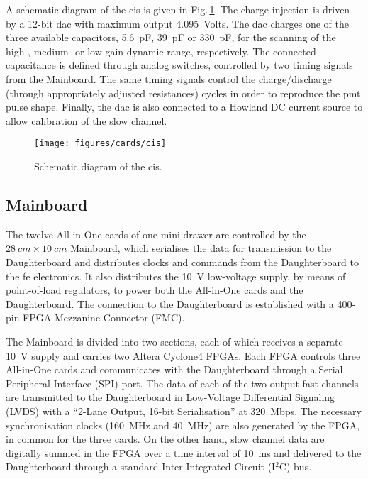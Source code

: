 A schematic diagram of the \gls{cis} is given in Fig.\,\ref{fig:cards:cis}. The charge injection is driven by a 12-bit 
\gls{dac} with maximum output \SI{4.095}{Volts}. The \gls{dac} charges one of the three available
capacitors, \SI{5.6}{pF}, \SI{39}{pF} or \SI{330}{pF}, for the scanning of the high-, medium- or low-gain dynamic 
range, respectively. The connected capacitance is defined through analog switches, controlled by two timing signals
from the Mainboard. The same timing signals control the charge/discharge (through appropriately adjusted resistances) 
cycles in order to reproduce the \gls{pmt} pulse shape. Finally, the \gls{dac} is also connected to a Howland DC current source
to allow calibration of the slow channel.

\begin{figure}[t]
  \begin{center}
    \texttt{[image: figures/cards/cis]}
    \caption{Schematic diagram of the \gls{cis}.\label{fig:cards:cis}}
  \end{center}
\end{figure}

\subsection{Mainboard}

The twelve All-in-One cards of one mini-drawer are controlled by the $\SI{28}{cm}\times\SI{10}{cm}$ Mainboard, which 
serialises the data for transmission to the Daughterboard and distributes clocks and commands from the Daughterboard 
to the \gls{fe} electronics. It also distributes the \SI{10}{V} low-voltage supply, by means of point-of-load regulators, 
to power both the All-in-One cards and the Daughterboard. The connection to the Daughterboard is established with a 
400-pin FPGA Mezzanine Connector (FMC).

The Mainboard is divided into two sections, each of which receives a separate \SI{10}{V} supply and carries two Altera 
Cyclone4 FPGAs. Each FPGA controls three All-in-One cards and communicates with the Daughterboard through a Serial Peripheral 
Interface (SPI) port. The data of each of the two output fast channels are transmitted to the Daughterboard in Low-Voltage 
Differential Signaling (LVDS) with a ``2-Lane Output, 16-bit Serialisation'' at \SI{320}{Mbps}. The necessary synchronisation 
clocks (\SI{160}{MHz} and \SI{40}{MHz}) are also generated by the FPGA, in common for the three cards. On the other hand, 
slow channel data are digitally summed in the FPGA over a time interval of \SI{10}{ms} and delivered to the Daughterboard 
through a standard Inter-Integrated Circuit (I$^2$C) bus.


\clearpage


